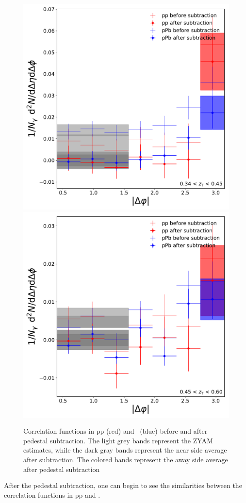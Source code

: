 \begin{figure}
\includegraphics[width = 0.24 \textwidth]{G-H_New/Befor_After_UE_pp-pPb_pT_0_zT_6.pdf}
\includegraphics[width = 0.24 \textwidth]{G-H_New/Befor_After_UE_pp-pPb_pT_0_zT_7.pdf}
\caption{Correlation functions in pp (red) and \pPb~(blue) before and after pedestal subtraction. The light grey bands represent the ZYAM estimates, while the dark gray bands represent the near side average after subtraction. The colored bands represent the away side average after pedestal subtraction}
\label{fig:BF_UE_zT_second}
\end{figure}

After the pedestal subtraction, one can begin to see the similarities between the correlation functions in pp and \pPb.

\FloatBarrier

